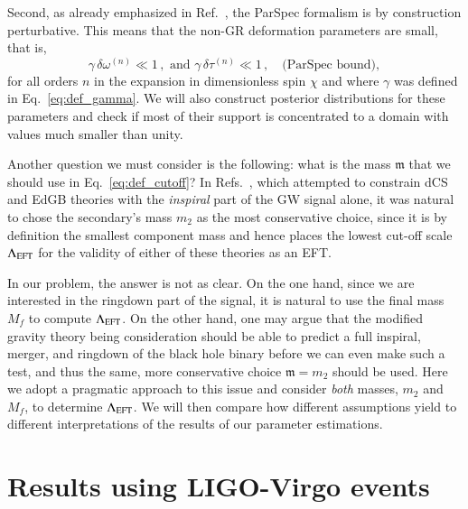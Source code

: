 \documentclass[twocolumn,
               prd,
               aps,
               superscriptaddress,
               tightenlines,
               nofootinbib,
               eqsecnum,
               amsfonts,
               amsmath,
               longbibliography]{revtex4-1}
\newcommand{\gm}{\mathfrak{m}}
\newcommand{\hs}[1]{{\textcolor{blue}{{[HS: #1]}} }}
\begin{document}
Second, as already emphasized in Ref.~\cite{Maselli:2019mjd}, the ParSpec
formalism is by construction perturbative. This means that the non-GR
deformation parameters are small, that is,
%
\begin{equation}
\gamma \, \delta \omega^{(n)} \ll 1 \,,
\,\, \textrm{and} \,\,
\gamma \, \delta \tau^{(n)} \ll 1 \,, \quad \textrm{(ParSpec bound)},
\label{eq:parspec_bound}
\end{equation}
%
for all orders $n$ in the expansion in dimensionless spin $\chi$ and where $\gamma$
was defined in Eq.~\eqref{eq:def_gamma}.
%
We will also construct posterior distributions for these parameters and check if
most of their support is concentrated to a domain with values much smaller than
unity.

Another question we must consider is the following: what is the mass $\mathfrak{m}$ that we should use
in Eq.~\eqref{eq:def_cutoff}?
%
In Refs.~\cite{Nair:2019iur,Perkins:2021mhb,Lyu:2022gdr}, which attempted to
constrain dCS and EdGB theories with the \emph{inspiral} part of
the GW signal alone, it was natural to chose the secondary's mass $m_2$ as the most
conservative choice, since it is by definition the smallest component mass and hence
places the lowest cut-off scale $\Lambda_{\rm EFT}$ for the validity of either of these theories as an EFT.

In our problem, the answer is not as clear. On the one hand, since we are
interested in the ringdown part of the signal, it is natural to use the
final mass $M_f$ to compute $\Lambda_{\rm EFT}$.
%
On the other hand, one may argue that the modified gravity theory being
consideration should be able to predict a full inspiral, merger, and ringdown
of the black hole binary before we can even make such a test, and thus the
same, more conservative choice $\gm = m_2$ should be used.
%
Here we adopt a pragmatic approach to this issue and consider \emph{both}
masses, $m_2$ and $M_f$, to determine $\Lambda_{\rm EFT}$.
%
We will then compare how different assumptions yield to different
interpretations of the results of our parameter estimations.



\section{Results using LIGO-Virgo events}
\label{sec:results}

\end{document}
